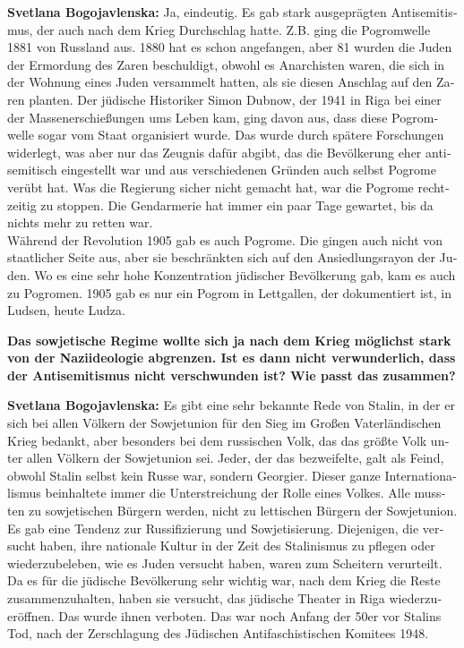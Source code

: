 \begin{otherlanguage}{ngerman}
\textbf{Svetlana Bogojavlenska:} Ja, eindeutig. Es gab stark ausgeprägten Antisemitismus, der auch nach dem Krieg Durchschlag hatte. Z.B. ging die Pogromwelle 1881 von Russland aus. 1880 hat es schon angefangen, aber 81 wurden die Juden der Ermordung des Zaren beschuldigt, obwohl es Anarchisten waren, die sich in der Wohnung eines Juden versammelt hatten, als sie diesen Anschlag auf den Zaren planten. Der jüdische Historiker Simon Dubnow, der 1941 in Riga bei einer der Massenerschießungen ums Leben kam, ging davon aus, dass diese Pogromwelle sogar vom Staat organisiert wurde. Das wurde durch spätere Forschungen widerlegt, was aber nur das Zeugnis dafür abgibt, das die Bevölkerung eher antisemitisch eingestellt war und aus verschiedenen Gründen auch selbst Pogrome verübt hat. Was die Regierung sicher nicht gemacht hat, war die Pogrome rechtzeitig zu stoppen. Die Gendarmerie hat immer ein paar Tage gewartet, bis da nichts mehr zu retten war.\\
Während der Revolution 1905 gab es auch Pogrome. Die gingen auch nicht von staatlicher Seite aus, aber sie beschränkten sich auf den Ansiedlungsrayon der Juden. Wo es eine sehr hohe Konzentration jüdischer Bevölkerung gab, kam es auch zu Pogromen. 1905 gab es nur ein Pogrom in Lettgallen, der dokumentiert ist, in Ludsen, heute Ludza. 

\textbf{Das sowjetische Regime wollte sich ja nach dem Krieg möglichst stark von der Naziideologie abgrenzen. Ist es dann nicht verwunderlich, dass der Antisemitismus nicht verschwunden ist? Wie passt das zusammen?}

\textbf{Svetlana Bogojavlenska:} Es gibt eine sehr bekannte Rede von Stalin, in der er sich bei allen Völkern der Sowjetunion für den Sieg im Großen Vaterländischen Krieg bedankt, aber besonders bei dem russischen Volk, das das größte Volk unter allen Völkern der Sowjetunion sei. Jeder, der das bezweifelte, galt als Feind, obwohl Stalin selbst kein Russe war, sondern Georgier. Dieser ganze Internationalismus beinhaltete immer die Unterstreichung der Rolle eines Volkes. Alle mussten zu sowjetischen Bürgern werden, nicht zu lettischen Bürgern der Sowjetunion. Es gab eine Tendenz zur Russifizierung und Sowjetisierung. Diejenigen, die versucht haben, ihre nationale Kultur in der Zeit des Stalinismus zu pflegen oder wiederzubeleben, wie es Juden versucht haben, waren zum Scheitern verurteilt. Da es für die jüdische Bevölkerung sehr wichtig war, nach dem Krieg die Reste zusammenzuhalten, haben sie versucht, das jüdische Theater in Riga wiederzueröffnen. Das wurde ihnen verboten. 
Das war noch Anfang der 50er vor Stalins Tod, nach der Zerschlagung des Jüdischen Antifaschistischen Komitees 1948.


\end{otherlanguage}
